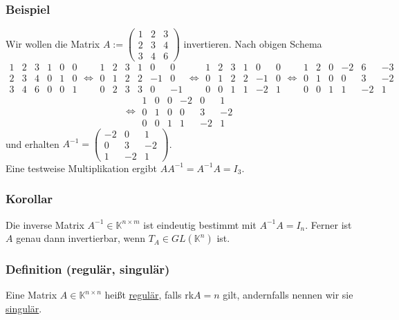 \subsubsection{Beispiel}
Wir wollen die Matrix $A:=\begin{pmatrix}1&2&3\\2&3&4\\3&4&6\end{pmatrix}$ invertieren.  Nach obigen Schema
\[\begin{array}{ccc|ccc}1&2&3&1&0&0\\2&3&4&0&1&0\\3&4&6&0&0&1\end{array}\Leftrightarrow \begin{array}{ccc|ccc}1&2&3&1&0&0\\0&1&2&2&-1&0\\0&2&3&3&0&-1\end{array}\Leftrightarrow \begin{array}{ccc|ccc}1&2&3&1&0&0\\0&1&2&2&-1&0\\0&0&1&1&-2&1\end{array}\Leftrightarrow \begin{array}{ccc|ccc}1&2&0&-2&6&-3\\0&1&0&0&3&-2\\0&0&1&1&-2&1\end{array}\]
\[\Leftrightarrow \begin{array}{ccc|ccc}1&0&0&-2&0&1\\0&1&0&0&3&-2\\0&0&1&1&-2&1\end{array}\]
und erhalten $A^{-1}=\begin{pmatrix}-2&0&1\\0&3&-2\\1&-2&1\end{pmatrix}$.\\
Eine testweise Multiplikation ergibt $AA^{-1}=A^{-1}A=I_3$.
\subsubsection{Korollar}
Die inverse Matrix $A^{-1}\in\mathbb{K}^{n\times m}$ ist eindeutig bestimmt mit $A^{-1}A=I_n$.  Ferner ist $A$ genau dann invertierbar, wenn $T_A\in GL(\mathbb{K}^n)$ ist.
\subsubsection{Definition (regulär, singulär)}
\label{regulaer}
Eine Matrix $A\in\mathbb{K}^{n\times n}$ heißt \underline{regulär}, falls rk$A=n$ gilt, andernfalls nennen wir sie \underline{singulär}.
